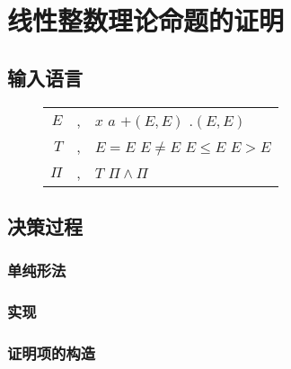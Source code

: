 \chapter{线性整数理论命题的证明}
\label{chap:lia}

\section{输入语言}
\begin{figure}[!htbp]
  \centering
  \begin{tabular}[rcl]{rcl}
    $E$ & \sep{} & $x$ \deli{} $a$ \deli{} $+(E, E)$ \deli{} $.(E, E)$ \\
    $T$ & \sep{} & $E = E$ \deli{} $E \neq E$ \deli{} $E \leq E$ \deli{} $E > E$ \\
    $\Pi$ & \sep{} & $T$ \deli{} $\Pi \land \Pi$ \\
  \end{tabular}
\end{figure}
\section{决策过程}
\subsection{单纯形法}
\subsection{实现}
\subsection{证明项的构造}

